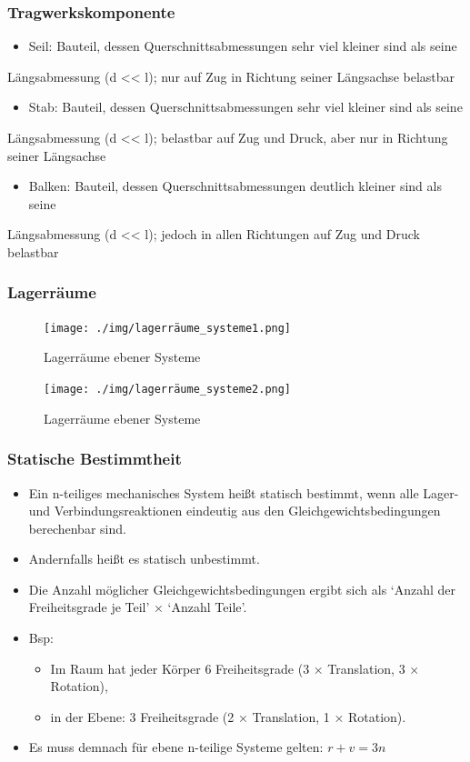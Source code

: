 \documentclass[11pt]{article}
\begin{document}
\subsubsection{Tragwerkskomponente}
\label{sec:org9782ddc}
\begin{itemize}
\item Seil: Bauteil, dessen Querschnittsabmessungen sehr viel kleiner sind als seine
\end{itemize}
Längsabmessung (d << l); nur auf Zug in Richtung seiner Längsachse belastbar
\begin{itemize}
\item Stab: Bauteil, dessen Querschnittsabmessungen sehr viel kleiner sind als seine
\end{itemize}
Längsabmessung (d << l); belastbar auf Zug und Druck, aber nur in Richtung seiner
Längsachse
\begin{itemize}
\item Balken: Bauteil, dessen Querschnittsabmessungen deutlich kleiner sind als seine
\end{itemize}
Längsabmessung (d << l); jedoch in allen Richtungen auf Zug und Druck belastbar
\subsubsection{Lagerräume}
\label{sec:org3195b4f}
\begin{figure}[htbp]
\centering
\texttt{[image: ./img/lagerräume\_systeme1.png]}
\caption{Lagerräume ebener Systeme}
\end{figure}
\begin{figure}[htbp]
\centering
\texttt{[image: ./img/lagerräume\_systeme2.png]}
\caption{Lagerräume ebener Systeme}
\end{figure}

\subsubsection{Statische Bestimmtheit}
\label{sec:orge85d95c}
\begin{itemize}
\item Ein n-teiliges mechanisches System heißt statisch bestimmt, wenn alle Lager- und Verbindungsreaktionen eindeutig aus den Gleichgewichtsbedingungen berechenbar sind.
\item Andernfalls heißt es statisch unbestimmt.

\item Die Anzahl möglicher Gleichgewichtsbedingungen ergibt sich als
‘Anzahl der Freiheitsgrade je Teil’ × ‘Anzahl Teile’.
\item Bsp:
\begin{itemize}
\item Im Raum hat jeder Körper 6 Freiheitsgrade (3 × Translation, 3 × Rotation),
\item in der Ebene: 3 Freiheitsgrade (2 × Translation, 1 × Rotation).
\end{itemize}

\item Es muss demnach für ebene n-teilige Systeme gelten:
\textbf{\(r + v = 3n\)}
\end{itemize}
\end{document}

